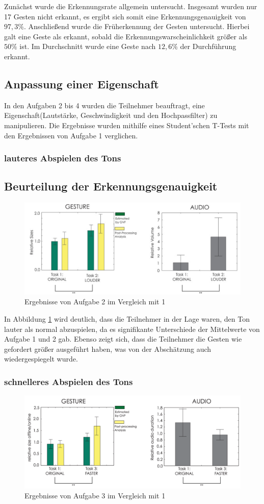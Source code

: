 \documentclass{llncs}
\begin{document}
Zunächst wurde die Erkennungsrate allgemein untersucht. Insgesamt wurden nur 17 Gesten nicht erkannt, es ergibt sich somit eine Erkennungsgenauigkeit von $97,3\%$. Anschließend wurde die Früherkennung der Gesten untersucht. Hierbei galt eine Geste als erkannt, sobald die Erkennungswarscheinlichkeit größer als $50\%$ ist. Im Durchschnitt wurde eine Geste nach $12,6\%$ der Durchführung erkannt.

\subsection{Anpassung einer Eigenschaft}
In den Aufgaben 2 bis 4 wurden die Teilnehmer beauftragt, eine Eigenschaft(Lautstärke, Geschwindigkeit und den Hochpassfilter) zu manipulieren. Die Ergebnisse wurden mithilfe eines Student'schen T-Tests mit den Ergebnissen von Aufgabe 1 verglichen.

\subsubsection{lauteres Abspielen des Tons}
\subsection{Beurteilung der Erkennungsgenauigkeit}
\begin{figure}
\centering
\includegraphics[width=0.7\linewidth]{../Bilder/Fig13}
\caption{Ergebnisse von Aufgabe 2 im Vergleich mit 1}
\label{fig:Fig13}
\end{figure}
In Abbildung \ref{fig:Fig13} wird deutlich, dass die Teilnehmer in der Lage waren, den Ton lauter als normal abzuspielen, da es signifikante Unterschiede der Mittelwerte von Aufgabe 1 und 2 gab. Ebenso zeigt sich, dass die Teilnehmer die Gesten wie gefordert größer ausgeführt haben, was von der Abschätzung auch wiedergespiegelt wurde.

\subsubsection{schnelleres Abspielen des Tons}
\begin{figure}
\centering
\includegraphics[width=0.7\linewidth]{../Bilder/Fig14}
\caption{Ergebnisse von Aufgabe 3 im Vergleich mit 1}
\label{fig:Fig14}
\end{figure}
\end{document}
